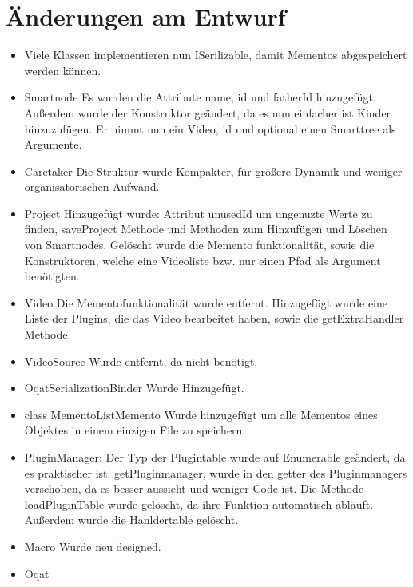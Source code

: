 \chapter{Änderungen am Entwurf}
\begin{itemize}
\item Viele Klassen implementieren nun ISerilizable, damit Mementos abgespeichert werden können.
\item Smartnode \newline
Es wurden die Attribute name, id und fatherId hinzugefügt. Außerdem wurde der Konstruktor geändert, da es nun einfacher ist Kinder hinzuzufügen. Er nimmt nun ein Video, id und optional einen Smarttree als Argumente.
\item Caretaker \newline
Die Struktur wurde Kompakter, für größere Dynamik und weniger organisatorischen Aufwand.
\item Project \newline
Hinzugefügt wurde: Attribut unusedId um ungenuzte Werte zu finden, saveProject Methode und Methoden zum Hinzufügen und Löschen von Smartnodes. Gelöscht wurde die Memento funktionalität, sowie die Konstruktoren, welche eine Videoliste bzw. nur einen Pfad als Argument benötigten.
\item Video \newline
Die Mementofunktionalität wurde entfernt. Hinzugefügt wurde eine Liste der Plugins, die das Video bearbeitet haben, sowie die getExtraHandler Methode.
\item VideoSource \newline
Wurde entfernt, da nicht benötigt.
\item OqatSerializationBinder \newline
Wurde Hinzugefügt.
\item class MementoListMemento \newline
Wurde hinzugefügt um alle Mementos eines Objektes in einem einzigen File zu speichern.
\item PluginManager: \newline
Der Typ der Plugintable wurde auf Enumerable geändert, da es praktischer ist. getPluginmanager, wurde in den getter des Pluginmanagers verschoben, da es besser aussieht und weniger Code ist.
Die Methode loadPluginTable wurde gelöscht, da ihre Funktion automatisch abläuft. Außerdem wurde die Hanldertable gelöscht.
\item Macro \newline
Wurde neu designed.
\item Oqat \newline

\end{itemize}

